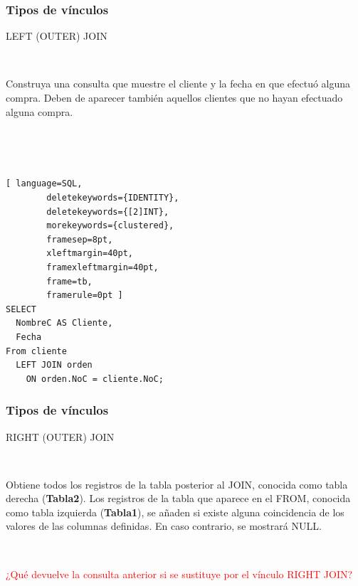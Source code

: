 \documentclass[
	10pt, %
	aspectratio=169, %
]{beamer}
\begin{document}

\begin{frame}[fragile]
	
	\frametitle{Tipos de vínculos}
	
	\begin{center}
		\textcolor{codepurple}{LEFT (OUTER) JOIN}
	\end{center}
	
	\ 
	
	Construya una consulta que muestre el cliente y la fecha en que efectuó alguna compra. Deben de aparecer también aquellos clientes que no hayan efectuado alguna compra.
	
	\pause 
	
	\ 
	
	\ 
	
	\begin{lstlisting}[ language=SQL,
		deletekeywords={IDENTITY},
		deletekeywords={[2]INT},
		morekeywords={clustered},
		framesep=8pt,
		xleftmargin=40pt,
		framexleftmargin=40pt,
		frame=tb,
		framerule=0pt ]
SELECT 
  NombreC AS Cliente, 
  Fecha
From cliente
  LEFT JOIN orden 
    ON orden.NoC = cliente.NoC;
\end{lstlisting}
	
\end{frame}


\begin{frame}[fragile]
	
	\frametitle{Tipos de vínculos}
	
	\begin{center}
	
		\textcolor{codepurple}{RIGHT (OUTER) JOIN}
		
		\ 
		
			Obtiene todos los registros de la tabla posterior al \textcolor{codepurple}{JOIN}, conocida como tabla derecha (\textbf{Tabla2}). Los registros de la tabla que aparece en el \textcolor{codepurple}{FROM}, conocida como tabla izquierda (\textbf{Tabla1}), se añaden si existe alguna coincidencia de los valores de las columnas definidas. En caso contrario, se mostrará \textcolor{codepurple}{NULL}.
		
		\begin{venndiagram2sets}[
			labelA={ }, labelOnlyA={Tabla1}, 
			labelB={ }, labelOnlyB={Tabla2}, 
			showframe=false]
			\fillB
		\end{venndiagram2sets}
		
	\end{center}
	
	\pause
	
	\ 
	
	\textcolor{red}{¿Qué devuelve la consulta anterior si se sustituye por el vínculo  \textcolor{codepurple}{RIGHT JOIN}?}
	
		
\end{frame}
\end{document}

